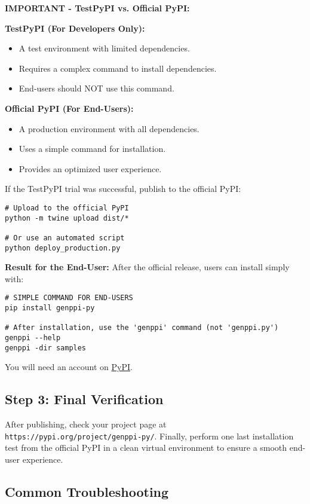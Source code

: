 \documentclass[11pt, a4paper]{article}
\begin{document}
\textbf{IMPORTANT - TestPyPI vs. Official PyPI:}

\textbf{TestPyPI (For Developers Only):}
\begin{itemize}
    \item A test environment with limited dependencies.
    \item Requires a complex command to install dependencies.
    \item End-users should NOT use this command.
\end{itemize}

\textbf{Official PyPI (For End-Users):}
\begin{itemize}
    \item A production environment with all dependencies.
    \item Uses a simple command for installation.
    \item Provides an optimized user experience.
\end{itemize}

If the TestPyPI trial was successful, publish to the official PyPI:
\begin{lstlisting}[style=bashstyle]
# Upload to the official PyPI
python -m twine upload dist/*

# Or use an automated script
python deploy_production.py
\end{lstlisting}

\textbf{Result for the End-User:}
After the official release, users can install simply with:
\begin{lstlisting}[style=bashstyle]
# SIMPLE COMMAND FOR END-USERS
pip install genppi-py

# After installation, use the 'genppi' command (not 'genppi.py')
genppi --help
genppi -dir samples
\end{lstlisting}

You will need an account on \href{https://pypi.org/}{PyPI}.

\subsection{Step 3: Final Verification}
After publishing, check your project page at \texttt{https://pypi.org/project/genppi-py/}. Finally, perform one last installation test from the official PyPI in a clean virtual environment to ensure a smooth end-user experience.

\subsection{Common Troubleshooting}
\end{document}
